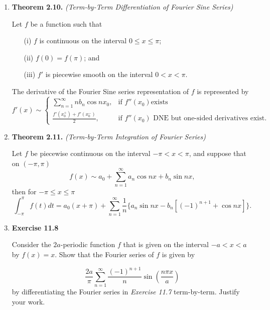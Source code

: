 \begin{enumerate}
\item \textbf{Theorem 2.10.} \textit{(Term-by-Term Differentiation of Fourier Sine Series)}

Let $f$ be a function such that
\begin{itemize}
\item[(i)] $f$ is continuous on the interval $0 \leq x \leq \pi$;
\item[(ii)] $f (0) = f (\pi)$; and
\item[(iii)] $f'$ is piecewise smooth on the interval $0 < x < \pi$.
\end{itemize}

The derivative of the Fourier Sine series representation of $f$ is represented by
\[
f'(x) \sim
\begin{cases}
\displaystyle \sum_{n=1}^{\infty}nb_{n}\cos nx_{0} , & \text{if  $f''(x _{0} )$
exists} \\
\displaystyle \frac{f'(x_{0}^{+})+f'(x_{0}^{-})}{2}, & \text{if $f '' (x _{0} )$ DNE but one-sided derivatives exist.}
\end{cases}
\]



\item \textbf{Theorem 2.11.} \textit{(Term-by-Term Integration of Fourier Series)}

Let $f$ be piecewise continuous on the interval $-\pi < x < \pi$, and suppose that on $(-\pi,\pi)$
\[f(x) \sim a_{0}+\sum_{n=1}^{\infty}a_{n}\cos nx + b_{n}\sin nx,\]
then for $-\pi\leq x \leq \pi$
\[\int_{-\pi}^{\pi}f(t)dt = a_{0}(x+\pi) + \sum_{n=1}^{\infty}\frac{1}{n}\{a_{n}\sin nx - b_{n}[(-1)^{n+1} + \cos nx]\}.\]




\item \textbf{Exercise 11.8} 

Consider the $2a$-periodic function $f$ that is given on the interval $-a < x < a$ by $f (x) = x$. Show that the Fourier series of $f$ is given by

\[\frac{2a}{\pi}\sum_{n=1}^{\infty}\frac{(-1)^{n+1}}{n}\sin\left( \frac{n\pi x}{a} \right)\]
by differentiating the Fourier series in \textit{Exercise 11.7} term-by-term. Justify your work.




\end{enumerate}
